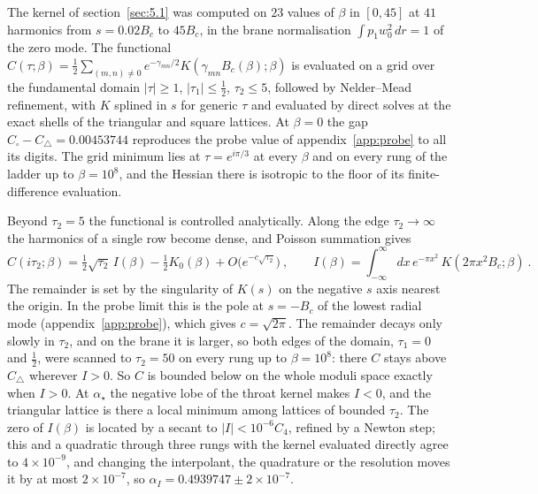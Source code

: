 The kernel of section~\ref{sec:5.1} was computed on $23$ values of $\beta$
in $[0, 45]$ at $41$ harmonics from $s = 0.02B_c$ to $45B_c$, in
the brane normalisation $\int p_1 w_0^2\,dr = 1$ of the zero mode. The
functional
$C(\tau;\beta) = \tfrac12\sum_{(m,n)\neq0} e^{-\gamma_{mn}/2}K(\gamma_{mn}B_c(\beta);\beta)$
is evaluated on a grid over the fundamental domain $|\tau| \ge 1$,
$|\tau_1| \le \tfrac12$, $\tau_2 \le 5$, followed by Nelder--Mead
refinement, with $K$ splined in $s$ for generic $\tau$ and evaluated by
direct solves at the exact shells of the triangular and square lattices. At
$\beta = 0$ the gap $C_\square - C_\triangle = 0.00453744$ reproduces the
probe value of appendix~\ref{app:probe} to all its digits. The grid minimum
lies at $\tau = e^{i\pi/3}$ at every $\beta$ and on every rung of the
ladder up to $\beta = 10^8$, and the Hessian there is isotropic to the
floor of its finite-difference evaluation.

Beyond $\tau_2 = 5$ the functional is controlled analytically. Along the
edge $\tau_2 \to \infty$ the harmonics of a single row become dense, and
Poisson summation gives
\begin{equation}
C(i\tau_2;\beta) = \tfrac12\sqrt{\tau_2}\,I(\beta) - \tfrac12K_0(\beta) + O\big(e^{-c\sqrt{\tau_2}}\big)~, \qquad
I(\beta) = \int_{-\infty}^{\infty}dx\,e^{-\pi x^2}\,K(2\pi x^2B_c;\beta)~.
\end{equation}
The remainder is set by the singularity of $K(s)$ on the negative $s$ axis
nearest the origin. In the probe limit this is the pole at $s = -B_c$ of
the lowest radial mode (appendix~\ref{app:probe}), which gives
$c = \sqrt{2\pi}$. The remainder decays only slowly in $\tau_2$, and on the
brane it is larger, so both edges of the domain, $\tau_1 = 0$ and $\tfrac12$, were scanned to
$\tau_2 = 50$ on every rung up to $\beta = 10^8$: there $C$ stays above
$C_\triangle$ wherever $I > 0$. So $C$ is bounded below on the whole
moduli space exactly when $I > 0$. At $\alpha_\star$ the negative lobe of
the throat kernel makes $I < 0$, and the triangular lattice is there a
local minimum among lattices of bounded $\tau_2$. The zero of $I(\beta)$ is
located by a secant to $|I| < 10^{-6}C_4$, refined by a Newton step; this
and a quadratic through three rungs with the kernel evaluated directly
agree to $4\times10^{-9}$, and changing the interpolant, the quadrature or
the resolution moves it by at most $2\times10^{-7}$, so
$\alpha_I = 0.4939747 \pm 2\times10^{-7}$.

